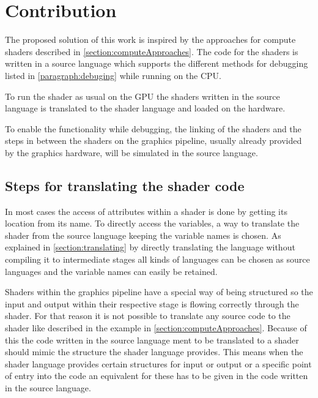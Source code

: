 

\chapter{Contribution}\label{cha:Contribution}

The proposed solution of this work is inspired by the approaches for compute shaders described in \autoref{section:computeApproaches}. The code for the shaders is written in a source language which supports the different methods for debugging listed in \autoref{paragraph:debuging} while running on the CPU.

To run the shader as usual on the GPU the shaders written in the source language is translated to the shader language and loaded on the hardware.

To enable the functionality while debugging, the linking of the shaders and the steps in between the shaders on the graphics pipeline, usually already provided by the graphics hardware, will be simulated in the source language.

\section{Steps for translating the shader code}
\label{section:contribution_translating}

In most cases the access of attributes within a shader is done by getting its location from its name. To directly access the variables, a way to translate the shader from the source language keeping the variable names is chosen. As explained in \autoref{section:translating} by directly translating the language without compiling it to intermediate stages all kinds of languages can be chosen as source languages and the variable names can easily be retained.

Shaders within the graphics pipeline have a special way of being structured so the input and output within their respective stage is flowing correctly through the shader. For that reason it is not possible to translate any source code to the shader like described in the example in  \autoref{section:computeApproaches}. Because of this the code written in the source language ment to be translated to a shader should mimic the structure the shader language provides. This means when the shader language provides certain structures for input or output or a specific point of entry into the code an equivalent for these has to be given in the code written in the source language.

